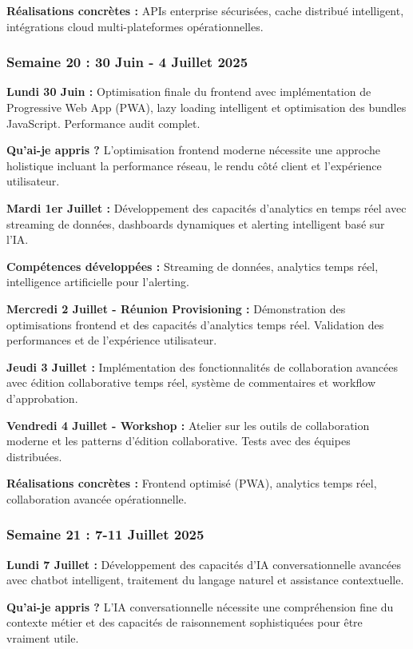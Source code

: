 \documentclass[a4paper,12pt]{article}
\begin{document}
\textbf{Réalisations concrètes :} APIs enterprise sécurisées, cache distribué intelligent, intégrations cloud multi-plateformes opérationnelles.

\subsubsection{Semaine 20 : 30 Juin - 4 Juillet 2025}

\textbf{Lundi 30 Juin :}
Optimisation finale du frontend avec implémentation de Progressive Web App (PWA), lazy loading intelligent et optimisation des bundles JavaScript. Performance audit complet.

\textbf{Qu'ai-je appris ?} L'optimisation frontend moderne nécessite une approche holistique incluant la performance réseau, le rendu côté client et l'expérience utilisateur.

\textbf{Mardi 1er Juillet :}
Développement des capacités d'analytics en temps réel avec streaming de données, dashboards dynamiques et alerting intelligent basé sur l'IA.

\textbf{Compétences développées :} Streaming de données, analytics temps réel, intelligence artificielle pour l'alerting.

\textbf{Mercredi 2 Juillet - Réunion Provisioning :}
Démonstration des optimisations frontend et des capacités d'analytics temps réel. Validation des performances et de l'expérience utilisateur.

\textbf{Jeudi 3 Juillet :}
Implémentation des fonctionnalités de collaboration avancées avec édition collaborative temps réel, système de commentaires et workflow d'approbation.

\textbf{Vendredi 4 Juillet - Workshop :}
Atelier sur les outils de collaboration moderne et les patterns d'édition collaborative. Tests avec des équipes distribuées.

\textbf{Réalisations concrètes :} Frontend optimisé (PWA), analytics temps réel, collaboration avancée opérationnelle.

\subsubsection{Semaine 21 : 7-11 Juillet 2025}

\textbf{Lundi 7 Juillet :}
Développement des capacités d'IA conversationnelle avancées avec chatbot intelligent, traitement du langage naturel et assistance contextuelle.

\textbf{Qu'ai-je appris ?} L'IA conversationnelle nécessite une compréhension fine du contexte métier et des capacités de raisonnement sophistiquées pour être vraiment utile.
\end{document}

